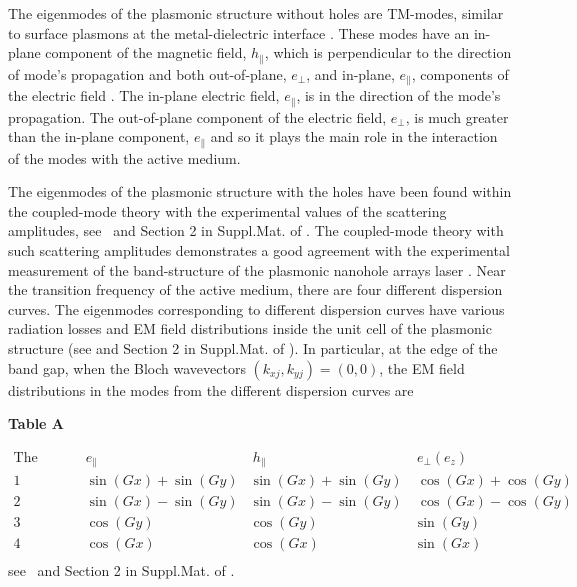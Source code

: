 \documentclass[aps,pra,amsmath,amssymb,onecolumn,superscriptaddress,showpacs,floatfix,]{revtex4-1}
\begin{document}
The eigenmodes of the plasmonic structure without holes are TM-modes, similar to surface plasmons at the metal-dielectric interface \cite{TennerJOpt,TennerACSPhot}. 
These modes have an in-plane component of the magnetic field, $h_{\parallel}$, which is perpendicular to the direction of mode's propagation and both out-of-plane, $e_{\perp}$, and in-plane, $e_{\parallel}$, components of the electric field \cite{TennerJOpt,TennerACSPhot}. 
The in-plane electric field, $e_{\parallel}$, is in the direction of the mode's propagation. 
The out-of-plane component of the electric field, $e_{\perp}$, is much greater than the in-plane component, $e_{\parallel}$ \cite{TennerJOpt,TennerACSPhot} and so it plays the main role in the interaction of the modes with the active medium.

The eigenmodes of the plasmonic structure with the holes have been found within the coupled-mode theory with the experimental values of the scattering amplitudes, see~\cite{TennerJOpt,TennerACSPhot} and Section 2 in Suppl.Mat. of \cite{nefedkin2018acsphot}. The coupled-mode theory with such scattering amplitudes demonstrates a good agreement with the experimental measurement of the band-structure of the plasmonic nanohole arrays laser \cite{TennerJOpt}.
Near the transition frequency of the active medium, there are four different dispersion curves. The eigenmodes corresponding to different dispersion curves have various radiation losses and EM field distributions inside the unit cell of the plasmonic structure (see \cite{TennerJOpt,TennerACSPhot} and Section 2 in Suppl.Mat. of \cite{nefedkin2018acsphot}). In particular, at the edge of the band gap, when the Bloch wavevectors $\left(k_{xj}, k_{yj}\right) = \left(0, 0\right)$, the EM field distributions in the modes from the different dispersion curves are 

\textbf{Table A}

$\begin{array}{cccc}
\text{The number of the dispersion curve} & e_{\parallel} & \
h_{\parallel} & \
e_ {\perp } \left( e_z \right) \\
\text{1} & \sin (G x)+\sin (G y) & \sin (G x)+\sin (G y) & \
\cos (G x)+\cos (G y) \\
\text{2} & \sin (G x)-\sin (G y) & \sin (G x)-\sin (G y) & \
\cos (G x)-\cos (G y) \\
\text{3} & \cos (G y) & \cos (G y) & \sin (G y) \\
\text{4} & \cos (G x) & \cos (G x) & \sin (G x) \\
\end{array}$
\\
see~\cite{TennerJOpt,TennerACSPhot} and Section 2 in Suppl.Mat. of \cite{nefedkin2018acsphot}.
\end{document}
